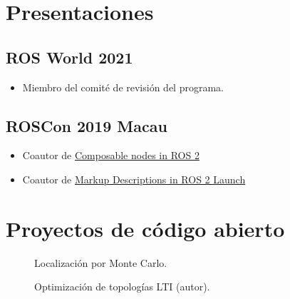 \documentclass[spanish, letterpaper]{resume}
\begin{document}
\noindent\begin{minipage}[t]{0.475\linewidth}
  \section*{Presentaciones}
  \subsection*[\icon{ros}]{ROS World 2021}
  \begin{itemize}
    \item Miembro del comité de revisión del programa.
  \end{itemize}
  \subsection*[\icon{ros}]{ROSCon 2019 Macau}
  \begin{itemize}
    \item Coautor de \href{https://roscon.ros.org/2019/talks/roscon2019_composablenodes.pdf}{Composable nodes in  ROS 2}
    \item Coautor de \href{https://roscon.ros.org/2019/talks/roscon2019_markupextensionsforros2launch.pdf}{Markup Descriptions in ROS 2 Launch}
  \end{itemize}
\end{minipage}\hfill
\begin{minipage}[t]{0.475\linewidth}
  \section*{Proyectos de código abierto}
  \begin{description}
    \item[] Localización por Monte Carlo.
    \item[] Optimización de topologías LTI (autor).
  \end{description}
\end{minipage}
\end{document}
